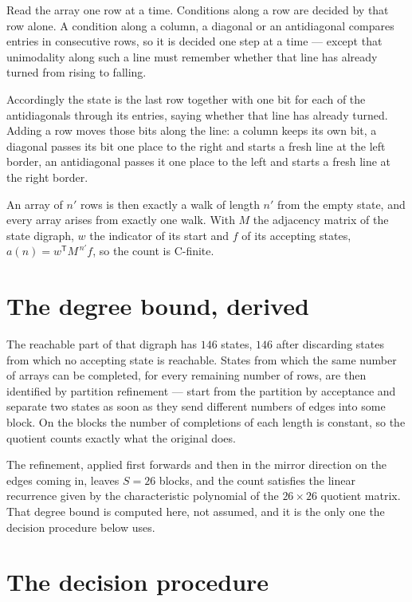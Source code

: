 \documentclass[11pt]{article}
\theoremstyle{definition}
\begin{document}
Read the array one row at a time. Conditions along a row are decided by that row alone. A condition along a column, a diagonal or an antidiagonal compares entries in consecutive rows, so it is decided one step at a time --- except that unimodality along such a line must remember whether that line has already turned from rising to falling.

Accordingly the state is the last row together with one bit for each of the antidiagonals through its entries, saying whether that line has already turned. Adding a row moves those bits along the line: a column keeps its own bit, a diagonal passes its bit one place to the right and starts a fresh line at the left border, an antidiagonal passes it one place to the left and starts a fresh line at the right border.

An array of $n'$ rows is then exactly a walk of length $n'$ from the empty state, and every array arises from exactly one walk. With $M$ the adjacency matrix of the state digraph, $w$ the indicator of its start and $f$ of its accepting states, $a(n) = w^{\mathsf T}M^{\,n'}f$, so the count is C-finite.

\section{The degree bound, derived}

The reachable part of that digraph has $146$ states, $146$ after discarding states from which no accepting state is reachable. States from which the same number of arrays can be completed, for every remaining number of rows, are then identified by partition refinement --- start from the partition by acceptance and separate two states as soon as they send different numbers of edges into some block. On the blocks the number of completions of each length is constant, so the quotient counts exactly what the original does.

The refinement, applied first forwards and then in the mirror direction on the edges coming in, leaves $S = 26$ blocks, and the count satisfies the linear recurrence given by the characteristic polynomial of the $26 \times 26$ quotient matrix. That degree bound is computed here, not assumed, and it is the only one the decision procedure below uses.

\section{The decision procedure}
\end{document}
